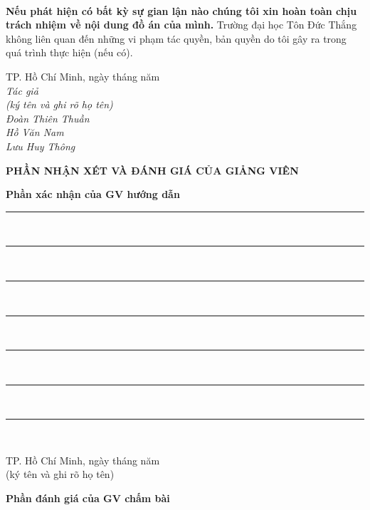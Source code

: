 \documentclass{report}
\newcommand\tab[1][1.25cm]{\hspace*{#1}}
\begin{document}
\paragraph{}
\textbf{Nếu phát hiện có bất kỳ sự gian lận nào chúng tôi xin hoàn toàn chịu trách nhiệm về nội dung đồ án của mình.} Trường đại học Tôn Đức Thắng không liên quan đến những vi phạm tác quyền, bản quyền do tôi gây ra trong quá trình thực hiện (nếu có).
\begin{flushright}
	TP. Hồ Chí Minh, ngày \tab[1cm] tháng \tab[1cm] năm \tab[1cm]\tab \\
	\textit{Tác giả \tab\tab\tab\tab\\
		(ký tên và ghi rõ họ tên)\tab[2cm] \\
		\vspace{1.5cm}
		Đoàn Thiên Thuần\tab\quad \tab\quad\\
		\vspace{1.5cm}
		Hồ Văn Nam\tab\quad \tab\quad\\
		\vspace{1.5cm}
		Lưu Huy Thông\tab\quad \tab\quad\\}

\end{flushright}
\pagebreak
\begin{center}
	\fontsize{16}{20}\selectfont
	\textbf{PHẦN NHẬN XÉT VÀ ĐÁNH GIÁ CỦA GIẢNG VIÊN}\\
\end{center}
\fontsize{13}{14}\selectfont
\textbf{Phần xác nhận của GV hướng dẫn}\\
\rule{17cm}{1pt}\\
\rule{17cm}{1pt}\\
\rule{17cm}{1pt}\\
\rule{17cm}{1pt}\\
\rule{17cm}{1pt}\\
\rule{17cm}{1pt}\\
\rule{17cm}{1pt}\\
\begin{flushright}
	TP. Hồ Chí Minh, ngày \tab[1cm] tháng \tab[1cm] năm \tab[1cm]\tab \\
	(ký tên và ghi rõ họ tên)\tab[2cm] \\
	\vspace{2cm}
\end{flushright}
\fontsize{13}{14}\selectfont
\textbf{Phần đánh giá của GV chấm bài}\\
\end{document}

